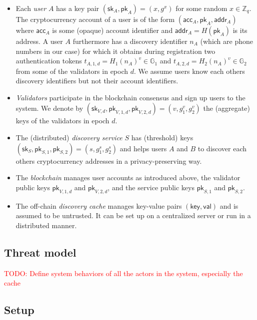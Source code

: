 \documentclass[11pt,letterpaper]{article}
\theoremstyle{definition}
\newcommand{\GG}{\mathbb{G}}
\newcommand{\ZZ}{\mathbb{Z}}
\newcommand{\key}{\mathsf{key}}
\newcommand{\val}{\mathsf{val}}
\newcommand{\pk}{\mathsf{pk}}
\newcommand{\sk}{\mathsf{sk}}
\newcommand{\acc}{\mathsf{acc}}
\newcommand{\addr}{\mathsf{addr}}
\begin{document}
\begin{itemize}

  \item Each \emph{user} $A$ has a key pair $(\sk_A, \pk_A) = (x, g^x)$ for some
        random $x \in \ZZ_q$. The cryptocurrency account of a user is of the form
        $(\acc_A, \pk_A, \addr_A)$ where $\acc_A$ is some (opaque) account
        identifier and $\addr_A = H(\pk_A)$ is its address. A user $A$ furthermore
        has a discovery identifier $n_A$ (which are phone numbers in our case) for
        which it obtains during registration two authentication tokens $t_{A,1,d} =
          H_1(n_A)^v \in \GG_1$ and $t_{A,2,d} = H_2(n_A)^v \in \GG_2$ from some of
        the validators in epoch $d$. We assume users know each others discovery
        identifiers but not their account identifiers.

  \item \emph{Validators} participate in the blockchain consensus and sign up
        users to the system. We denote by $(\sk_{V,d}, \pk_{V,1,d}, \pk_{V,2,d}) =
          (v, g_1^v, g_2^v)$ the (aggregate) keys of the validators in epoch $d$.

  \item The (distributed) \emph{discovery service} $S$ has (threshold) keys
        $(\sk_S, \pk_{S,1}, \pk_{S,2}) = (s, g_1^s, g_2^s)$ and helps users $A$ and
        $B$ to discover each others cryptocurrency addresses in a privacy-preserving
        way.

  \item The \emph{blockchain} manages user accounts as introduced above, the
        validator public keys $\pk_{V,1,d}$ and $\pk_{V,2,d}$, and the service
        public keys $\pk_{S,1}$ and $\pk_{S,2}$.

  \item The off-chain \emph{discovery cache} manages key-value pairs $(\key,
          \val)$ and is assumed to be untrusted. It can be set up on a centralized
        server or run in a distributed manner.


\end{itemize}

\subsection{Threat model}
\textcolor{red}{TODO: Define system behaviors of all the actors in the system, especially the cache}

\subsection{Setup}\label{sec:setup}
\end{document}
